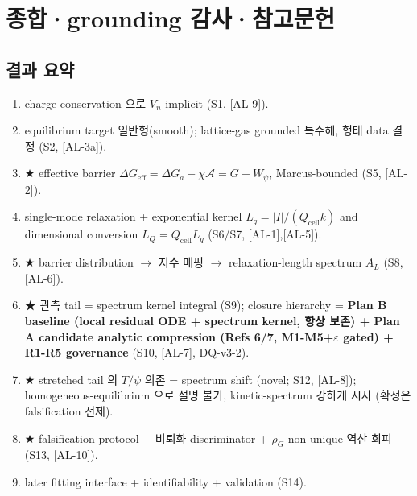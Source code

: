 \documentclass[11pt,a4paper]{article}
\newcommand{\eff}{\mathrm{eff}}
\newcommand{\cell}{\mathrm{cell}}
\newcommand{\AL}[1]{\textsf{[AL-#1]}}
\begin{document}
\section{종합·grounding 감사·참고문헌}\label{sec:summary}
\subsection{결과 요약}
\begin{enumerate}[label=\textbf{(R\arabic*)}]
\item charge conservation 으로 $V_n$ implicit (S1, \AL{9}).
\item equilibrium target 일반형(smooth); lattice-gas grounded 특수해, 형태 data 결정 (S2, \AL{3a}).
\item ★ effective barrier $\Delta G_\eff=\Delta G_a-\chi\mathcal A=G-W_\psi$, Marcus-bounded (S5, \AL{2}).
\item single-mode relaxation + exponential kernel $L_q=|I|/(Q_\cell k)$ and dimensional conversion $L_Q=Q_\cell L_q$ (S6/S7, \AL{1},\AL{5}).
\item ★ barrier distribution $\to$ 지수 매핑 $\to$ relaxation-length spectrum $A_L$ (S8, \AL{6}).
\item ★ 관측 tail = spectrum kernel integral (S9); closure hierarchy = \textbf{Plan B baseline (local residual ODE + spectrum kernel, 항상 보존) + Plan A candidate analytic compression (Refs 6/7, M1-M5+$\varepsilon$ gated) +
  R1-R5 governance} (S10, \AL{7}, DQ-v3-2).
\item ★ stretched tail 의 $T/\psi$ 의존 = spectrum shift (novel; S12, \AL{8}); homogeneous-equilibrium 으로 설명 불가, kinetic-spectrum 강하게 시사 (확정은 falsification 전제).
\item ★ falsification protocol + 비퇴화 discriminator + $\rho_G$ non-unique 역산 회피 (S13, \AL{10}).
\item later fitting interface + identifiability + validation (S14).
\end{enumerate}
\end{document}
